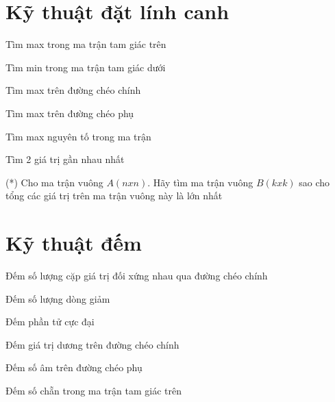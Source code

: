 \section{Kỹ thuật đặt lính canh}
\begin{problem}
    Tìm max trong ma trận tam giác trên
\end{problem}
\begin{problem}
    Tìm min trong ma trận tam giác dưới
\end{problem}
\begin{problem}
    Tìm max trên đường chéo chính
\end{problem}
\begin{problem}
    Tìm max trên đường chéo phụ
\end{problem}
\begin{problem}
    Tìm max nguyên tố trong ma trận
\end{problem}
\begin{problem}
    Tìm 2 giá trị gần nhau nhất
\end{problem}
\begin{problem}
    (*) Cho ma trận vuông $A(n x n)$. Hãy tìm ma trận vuông $B(k x k)$ sao cho tổng các giá trị trên ma trận vuông này là lớn nhất
\end{problem}


\section{Kỹ thuật đếm}
\begin{problem}
    Đếm số lượng cặp giá trị đối xứng nhau qua đường chéo chính
\end{problem}
\begin{problem}
    Đếm số lượng dòng giảm
\end{problem}
\begin{problem}
    Đếm phần tử cực đại
\end{problem}
\begin{problem}
    Đếm giá trị dương trên đường chéo chính
\end{problem}
\begin{problem}
    Đếm số âm trên đường chéo phụ
\end{problem}
\begin{problem}
    Đếm số chẵn trong ma trận tam giác trên
\end{problem}


